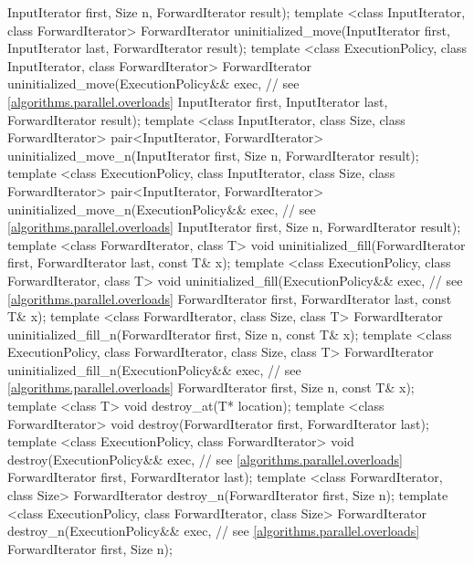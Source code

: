 \begin{codeblock}
{                                         InputIterator first, Size n,
                                         ForwardIterator result);
  template <class InputIterator, class ForwardIterator>
    ForwardIterator uninitialized_move(InputIterator first, InputIterator last,
                                       ForwardIterator result);
  template <class ExecutionPolicy, class InputIterator, class ForwardIterator>
    ForwardIterator uninitialized_move(ExecutionPolicy&& exec, // see \ref{algorithms.parallel.overloads}
                                       InputIterator first, InputIterator last,
                                       ForwardIterator result);
  template <class InputIterator, class Size, class ForwardIterator>
    pair<InputIterator, ForwardIterator>
      uninitialized_move_n(InputIterator first, Size n, ForwardIterator result);
  template <class ExecutionPolicy, class InputIterator, class Size, class ForwardIterator>
    pair<InputIterator, ForwardIterator>
      uninitialized_move_n(ExecutionPolicy&& exec, // see \ref{algorithms.parallel.overloads}
                           InputIterator first, Size n, ForwardIterator result);
  template <class ForwardIterator, class T>
    void uninitialized_fill(ForwardIterator first, ForwardIterator last,
                            const T& x);
  template <class ExecutionPolicy, class ForwardIterator, class T>
    void uninitialized_fill(ExecutionPolicy&& exec, // see \ref{algorithms.parallel.overloads}
                            ForwardIterator first, ForwardIterator last,
                            const T& x);
  template <class ForwardIterator, class Size, class T>
    ForwardIterator uninitialized_fill_n(ForwardIterator first, Size n, const T& x);
  template <class ExecutionPolicy, class ForwardIterator, class Size, class T>
    ForwardIterator uninitialized_fill_n(ExecutionPolicy&& exec, // see \ref{algorithms.parallel.overloads}
                                         ForwardIterator first, Size n, const T& x);
  template <class T>
    void destroy_at(T* location);
  template <class ForwardIterator>
    void destroy(ForwardIterator first, ForwardIterator last);
  template <class ExecutionPolicy, class ForwardIterator>
    void destroy(ExecutionPolicy&& exec, // see \ref{algorithms.parallel.overloads}
                 ForwardIterator first, ForwardIterator last);
  template <class ForwardIterator, class Size>
    ForwardIterator destroy_n(ForwardIterator first, Size n);
  template <class ExecutionPolicy, class ForwardIterator, class Size>
    ForwardIterator destroy_n(ExecutionPolicy&& exec, // see \ref{algorithms.parallel.overloads}
                              ForwardIterator first, Size n);

}
\end{codeblock}
